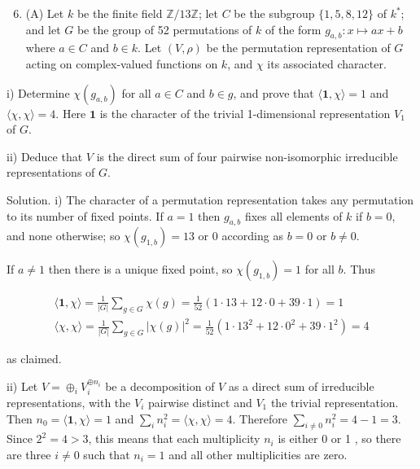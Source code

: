 \documentclass[10pt]{article}
\begin{document}
\begin{enumerate}
  \setcounter{enumi}{5}
  \item (A) Let $k$ be the finite field $\mathbb{Z} / 13 \mathbb{Z}$; let $C$ be the subgroup $\{1,5,8,12\}$ of $k^{*}$; and let $G$ be the group of 52 permutations of $k$ of the form $g_{a, b}: x \mapsto a x+b$ where $a \in C$ and $b \in k$. Let $(V, \rho)$ be the permutation representation of $G$ acting on complex-valued functions on $k$, and $\chi$ its associated character.
\end{enumerate}

i) Determine $\chi\left(g_{a, b}\right)$ for all $a \in C$ and $b \in g$, and prove that $\langle\mathbf{1}, \chi\rangle=1$ and $\langle\chi, \chi\rangle=4$. Here $\mathbf{1}$ is the character of the trivial 1-dimensional representation $V_{1}$ of $G$.

ii) Deduce that $V$ is the direct sum of four pairwise non-isomorphic irreducible representations of $G$.

Solution. i) The character of a permutation representation takes any permutation to its number of fixed points. If $a=1$ then $g_{a, b}$ fixes all elements of $k$ if $b=0$, and none otherwise; so $\chi\left(g_{1, b}\right)=13$ or 0 according as $b=0$ or $b \neq 0$.

If $a \neq 1$ then there is a unique fixed point, so $\chi\left(g_{1, b}\right)=1$ for all $b$. Thus

$$
\begin{gathered}
\langle\mathbf{1}, \chi\rangle=\frac{1}{|G|} \sum_{g \in G} \chi(g)=\frac{1}{52}(1 \cdot 13+12 \cdot 0+39 \cdot 1)=1 \\
\langle\chi, \chi\rangle=\frac{1}{|G|} \sum_{g \in G}|\chi(g)|^{2}=\frac{1}{52}\left(1 \cdot 13^{2}+12 \cdot 0^{2}+39 \cdot 1^{2}\right)=4
\end{gathered}
$$

as claimed.

ii) Let $V=\oplus_{i} V_{i}^{\oplus n_{i}}$ be a decomposition of $V$ as a direct sum of irreducible representations, with the $V_{i}$ pairwise distinct and $V_{1}$ the trivial representation. Then $n_{0}=\langle\mathbf{1}, \chi\rangle=1$ and $\sum_{i} n_{i}^{2}=\langle\chi, \chi\rangle=4$. Therefore $\sum_{i \neq 0} n_{i}^{2}=4-1=3$. Since $2^{2}=4>3$, this means that each multiplicity $n_{i}$ is either 0 or 1 , so there are three $i \neq 0$ such that $n_{i}=1$ and all other multiplicities are zero.
\end{document}
